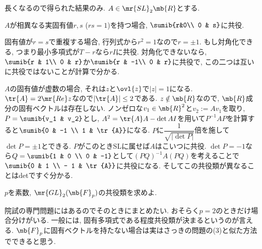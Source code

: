 \begin{ans}
長くなるので得られた結果のみ. $A\in \mr{SL}_{2}\mb{R}$とする. 
\ben 
\item $A$が相異なる実固有値$r,s$ ($rs=1$)を持つ場合, $\sumib{r&0\\ 0 & s}$に共役. 
\item 固有値が$r=s$で重複する場合, 行列式から$r^2 = 1$なので$r=\pm 1$. もし対角化できる, つまり最小多項式が$T-r$なら$rI$に共役. 対角化できないなら, $\sumib{r & 1\\ 0 & r}$か$\sumib{r & -1\\ 0 & r}$に共役で, この二つは互いに共役ではないことが計算で分かる. 
\item $A$の固有値が虚数の場合, それは$z$と$\ovl{z}$で$|z|=1$になる. $\tr{A} = 2\mr{Re}z $なので$|\tr{A}|\leq 2$である. $z\notin \mb{R}$なので, $\mb{R}$成分の固有ベクトルは存在しない. ノンゼロな$v_1 \in \mb{R}^2$と$v_2 := Av_1$を取り, $P=\sumib{v_1 & v_2}$とし, $A^2 = \tr{A}A - \det{A} I$を用いて$P^{-1}AP$を計算すると$\sumib{0 & -1 \\ 1 & \tr{A}}$になる. $P$に$\dfrac{1}{\sqrt{|\det{P}|}}$倍を施して$\det{P}=\pm 1$とできる. $P$がこのときSLに属せば$A$はこいつに共役. $\det{P} = -1$なら$Q=\sumib{1 & 0 \\ 0 & -1}$として$(PQ)^{-1} A (PQ)$を考えることで$\sumib{0 & 1 \\ - 1 & \tr{A}}$に共役になる. そしてこの共役類が異なることはdetですぐ分かる. 

\een

\end{ans}

\begin{prob}
$p$を素数, $\mr{GL}_{2}(\mb{F}_{p})$の共役類を求めよ. 
\end{prob}

\begin{ans}
院試の専門問題にはあるのでそのときにまとめたい. おそらく$p=2$のときだけ場合分けがいる. 一般には, 固有多項式である程度共役類が決まるというのが言える. $\mb{F}_{p}$に固有ベクトルを持たない場合は実はさっきの問題の(3)と似た方法でできると思う. 
\end{ans}


